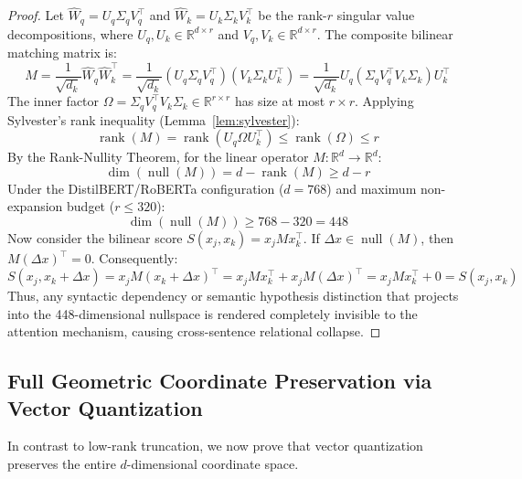 \documentclass{article}
\begin{document}
\begin{proof}
Let $\hat{W}_q = U_q \Sigma_q V_q^\top$ and $\hat{W}_k = U_k \Sigma_k V_k^\top$ be the rank-$r$ singular value decompositions, where $U_q, U_k \in \mathbb{R}^{d \times r}$ and $V_q, V_k \in \mathbb{R}^{d \times r}$.
The composite bilinear matching matrix is:
\begin{equation}
    M = \frac{1}{\sqrt{d_k}} \hat{W}_q \hat{W}_k^\top = \frac{1}{\sqrt{d_k}} (U_q \Sigma_q V_q^\top) (V_k \Sigma_k U_k^\top) = \frac{1}{\sqrt{d_k}} U_q (\Sigma_q V_q^\top V_k \Sigma_k) U_k^\top
\end{equation}
The inner factor $\Omega = \Sigma_q V_q^\top V_k \Sigma_k \in \mathbb{R}^{r \times r}$ has size at most $r \times r$. Applying Sylvester's rank inequality (Lemma~\ref{lem:sylvester}):
\begin{equation}
    \operatorname{rank}(M) = \operatorname{rank}\left(U_q \Omega U_k^\top\right) \le \operatorname{rank}(\Omega) \le r
\end{equation}
By the Rank-Nullity Theorem, for the linear operator $M: \mathbb{R}^d \to \mathbb{R}^d$:
\begin{equation}
    \operatorname{dim}(\operatorname{null}(M)) = d - \operatorname{rank}(M) \ge d - r
\end{equation}
Under the DistilBERT/RoBERTa configuration ($d=768$) and maximum non-expansion budget ($r \le 320$):
\begin{equation}
    \operatorname{dim}(\operatorname{null}(M)) \ge 768 - 320 = 448
\end{equation}
Now consider the bilinear score $S(x_j, x_k) = x_j M x_k^\top$. If $\Delta x \in \operatorname{null}(M)$, then $M (\Delta x)^\top = 0$. Consequently:
\begin{equation}
    S(x_j, x_k + \Delta x) = x_j M (x_k + \Delta x)^\top = x_j M x_k^\top + x_j M (\Delta x)^\top = x_j M x_k^\top + 0 = S(x_j, x_k)
\end{equation}
Thus, any syntactic dependency or semantic hypothesis distinction that projects into the 448-dimensional nullspace is rendered completely invisible to the attention mechanism, causing cross-sentence relational collapse.
\end{proof}

\subsection{Full Geometric Coordinate Preservation via Vector Quantization}
In contrast to low-rank truncation, we now prove that vector quantization preserves the entire $d$-dimensional coordinate space.
\end{document}
